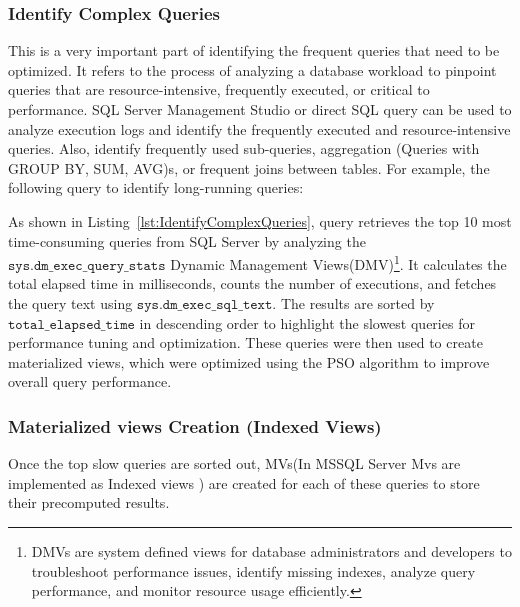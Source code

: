 

\subsubsection{Identify Complex Queries} This is a very important part of identifying the frequent queries that need to be optimized. It refers to the process of analyzing a database workload to pinpoint queries that are resource-intensive, frequently executed, or critical to performance. SQL Server Management Studio or direct SQL query can be used to analyze execution logs and identify the frequently executed and resource-intensive queries. Also, identify frequently used sub-queries, aggregation (Queries with GROUP BY, SUM, AVG)s, or frequent joins between tables. For example, the following query to identify long-running queries: \vspace{.4cm}



As shown in Listing~\ref{lst:IdentifyComplexQueries}, query retrieves the top 10 most time-consuming queries from SQL Server by analyzing the \(\texttt{sys.dm\_exec\_query\_stats}\) Dynamic Management Views(DMV)\footnote{DMVs are system defined views for database administrators and developers to troubleshoot performance issues, identify missing indexes, analyze query performance, and monitor resource usage efficiently.}. It calculates the total elapsed time in milliseconds, counts the number of executions, and fetches the query text using \(\texttt{sys.dm\_exec\_sql\_text}\). The results are sorted by \(\texttt{total\_elapsed\_time}\) in descending order to highlight the slowest queries for performance tuning and optimization. These queries were then used to create materialized views, which were optimized using the PSO algorithm to improve overall query performance.

\subsubsection{ Materialized views Creation (Indexed Views)}\label{Query_decomposition} Once the top slow queries are sorted out, MVs(In MSSQL Server Mvs are implemented as Indexed views ) are created for each of these queries to store their precomputed results.\vspace{.4cm}

  \vspace{.4cm} 



